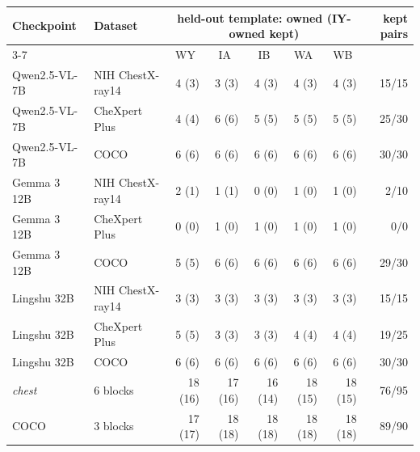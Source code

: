 \begin{table}[h]
\medskip
\begin{tabular}{llrrrrrr}
\toprule
\multirow{2}{*}{Checkpoint} & \multirow{2}{*}{Dataset} & \multicolumn{5}{c}{held-out template: owned (IY-owned kept)} & \multirow{2}{*}{kept pairs}\\
\cmidrule(lr){3-7}
&  & \multicolumn{1}{c}{WY} & \multicolumn{1}{c}{IA} & \multicolumn{1}{c}{IB} & \multicolumn{1}{c}{WA} & \multicolumn{1}{c}{WB} & \\
\midrule
Qwen2.5-VL-7B & NIH ChestX-ray14 & 4 (3) & 3 (3) & 4 (3) & 4 (3) & 4 (3) & 15/15 \\
Qwen2.5-VL-7B & CheXpert Plus & 4 (4) & 6 (6) & 5 (5) & 5 (5) & 5 (5) & 25/30 \\
Qwen2.5-VL-7B & COCO & 6 (6) & 6 (6) & 6 (6) & 6 (6) & 6 (6) & 30/30 \\
Gemma 3 12B & NIH ChestX-ray14 & 2 (1) & 1 (1) & 0 (0) & 1 (0) & 1 (0) & 2/10 \\
Gemma 3 12B & CheXpert Plus & 0 (0) & 1 (0) & 1 (0) & 1 (0) & 1 (0) & 0/0 \\
Gemma 3 12B & COCO & 5 (5) & 6 (6) & 6 (6) & 6 (6) & 6 (6) & 29/30 \\
Lingshu 32B & NIH ChestX-ray14 & 3 (3) & 3 (3) & 3 (3) & 3 (3) & 3 (3) & 15/15 \\
Lingshu 32B & CheXpert Plus & 5 (5) & 3 (3) & 3 (3) & 4 (4) & 4 (4) & 19/25 \\
Lingshu 32B & COCO & 6 (6) & 6 (6) & 6 (6) & 6 (6) & 6 (6) & 30/30 \\
\midrule
\textit{chest} & 6 blocks & 18 (16) & 17 (16) & 16 (14) & 18 (15) & 18 (15) & 76/95 \\
COCO & 3 blocks & 17 (17) & 18 (18) & 18 (18) & 18 (18) & 18 (18) & 89/90 \\
\bottomrule
\end{tabular}
\end{table}
